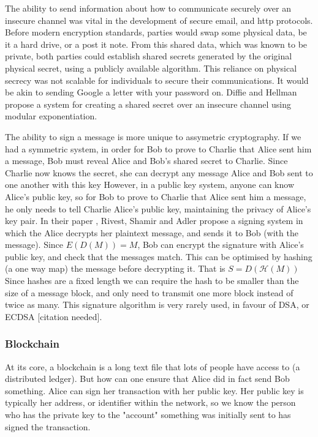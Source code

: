 \documentclass{article}
\begin{document}
The ability to send information about how to communicate securely over an insecure channel was vital in the development of secure email, and http protocols.
Before modern encryption standards, parties would swap some physical data, be it a hard drive, or a post it note.
From this shared data, which was known to be private,
both parties could establish shared secrets generated by the original physical secret,
using a publicly available algorithm.
This reliance on physical secrecy was not scalable for individuals to secure their communications.
It would be akin to sending Google a letter with your password on.
Diffie and Hellman \cite{Directions} propose a system for creating a shared secret over an insecure channel using modular exponentiation.

The ability to sign a message is more unique to assymetric cryptography.
If we had a symmetric system, in order for Bob to prove to Charlie that Alice sent him a message,
Bob must reveal Alice and Bob's shared secret to Charlie.
Since Charlie now knows the secret, she can decrypt any message Alice and Bob sent to one another with this key
However, in a public key system, anyone can know Alice's public key, so for Bob to prove to Charlie that Alice sent him a message,
he only needs to tell Charlie Alice's public key, maintaining the privacy of Alice's key pair.
In their paper \cite{RSA}, Rivest, Shamir and Adler propose a signing system
in which the Alice decrypts her plaintext message, and sends it to Bob (with the message).
Since $E(D(M)) = M$, Bob can encrypt the signature with Alice's public key, and check that the messages match.
This can be optimised by hashing (a one way map) the message before decrypting it. That is $S = D(\mathcal{H}(M))$
Since hashes are a fixed length we can require the hash to be smaller than the size of a message block,
and only need to transmit one more block instead of twice as many.
This signature algorithm is very rarely used, in favour of DSA, or ECDSA [citation needed].

\subsubsection{Blockchain}
At its core, a blockchain is a long text file that lots of people have access to (a distributed ledger).
But how can one ensure that Alice did in fact send Bob something.
Alice can sign her transaction with her public key.
Her public key is typically her address, or identifier within the network,
so we know the person who has the private key to the "account"
something was initially sent to has signed the transaction.
\end{document}
